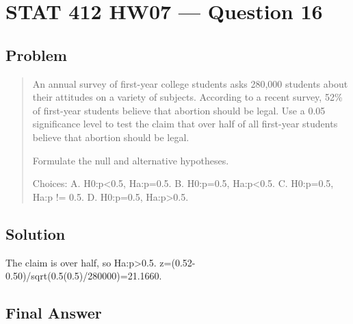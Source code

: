 \documentclass[11pt]{article}
\begin{document}
\section*{STAT 412 HW07 --- Question 16}

\subsection*{Problem}

\begin{quote}
An annual survey of first-year college students asks 280,000 students about their attitudes on a variety of subjects. According to a recent survey, 52\% of first-year students believe that abortion should be legal. Use a 0.05 significance level to test the claim that over half of all first-year students believe that abortion should be legal.

Formulate the null and alternative hypotheses.

Choices: A. H0:p<0.5, Ha:p=0.5. B. H0:p=0.5, Ha:p<0.5. C. H0:p=0.5, Ha:p != 0.5. D. H0:p=0.5, Ha:p>0.5.
\end{quote}

\subsection*{Solution}

The claim is over half, so Ha:p>0.5. z=(0.52-0.50)/sqrt(0.5(0.5)/280000)=21.1660.

\subsection*{Final Answer}

\end{document}
